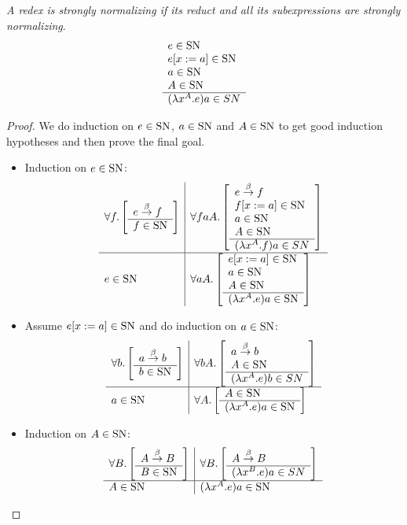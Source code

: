 \begin{theorem}
    \label{StronglyNormalizingRedex}
    \emph{A redex is strongly normalizing if its reduct and all its
    subexpressions are strongly normalizing}.
    $$
    \begin{array}{l} 
        e \in \text{SN}
        \\
        e[x:=a] \in \text{SN}
        \\
        a \in \text{SN}
        \\
        A \in \text{SN}
     \\ \hline 
        (\lambda x^A.e) a \in SN
    \end{array}
    $$

    \begin{proof}
        We do induction on $e \in \text{SN}$, $a \in \text{SN}$ and $A \in \text{SN}$ to get
        good induction hypotheses and then prove the final goal.

        \begin{itemize}
        \item Induction on $e \in \text{SN}$:
            $$
            \begin{array}{l|l} \forall f. \left[ \begin{array}{l} e \stackrel{\beta}{\to} f \\ \hline f \in \text{SN}\end{array} \right] & 
                \forall faA. \left[ \begin{array}{l} 
                    e \stackrel{\beta}{\to} f
                    \\
                    f[x:=a] \in \text{SN}
                    \\
                    a \in \text{SN}
                    \\
                    A \in \text{SN}
                 \\ \hline (\lambda x^A. f)a \in SN\end{array} \right]
             \\ \hline e \in \text{SN} & 
                \forall aA. \left[ \begin{array}{l} 
                    e[x:=a] \in \text{SN}
                    \\
                    a \in \text{SN}
                    \\
                    A \in \text{SN}
                 \\ \hline (\lambda x^A.e) a \in \text{SN}\end{array} \right]
             \end{array}
            $$

        \item Assume $e[x:=a] \in \text{SN}$ and do induction on $a \in \text{SN}$:
            $$
            \begin{array}{l|l} \forall b. \left[ \begin{array}{l} a \stackrel{\beta}{\to} b \\ \hline b \in \text{SN}\end{array} \right] & 
                \forall bA. \left[ \begin{array}{l} 
                    a \stackrel{\beta}{\to} b
                    \\
                    A \in \text{SN}
                 \\ \hline (\lambda x^A. e)b \in SN\end{array} \right]
             \\ \hline a \in \text{SN} & 
                \forall A. \left[ \begin{array}{l} 
                    A \in \text{SN}
                 \\ \hline (\lambda x^A.e) a \in \text{SN}\end{array} \right]
             \end{array}
            $$

        \item Induction on $A \in \text{SN}$:
            $$
            \begin{array}{l|l} \forall B. \left[ \begin{array}{l} A \stackrel{\beta}{\to} B \\ \hline B \in \text{SN}\end{array} \right] & \forall B. \left[ \begin{array}{l}  A \stackrel{\beta}{\to} B \\ \hline (\lambda x^B. e)a \in SN\end{array} \right] \\ \hline A \in \text{SN} & (\lambda x^A.e) a \in \text{SN} \end{array}
            $$


\end{itemize}
\end{proof}
\end{theorem}
